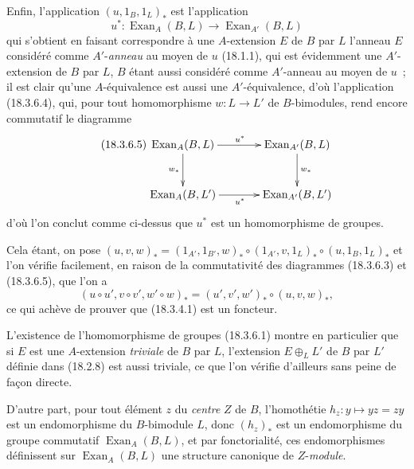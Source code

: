 \begin{env}[18.3.6.4]
\label{0.18.3.6.4-fr}
Enfin, l'application $(u,1_B,1_L)_*$ est l'application
\[
  u^*:\operatorname{Exan}_A(B,L)\longrightarrow
  \operatorname{Exan}_{A'}(B,L)
\]
qui s'obtient en faisant correspondre à une $A$-extension $E$ de $B$ par $L$
l'anneau $E$ considéré comme $A'$-\emph{anneau} au moyen de $u$ (18.1.1), qui
est évidemment une $A'$-extension de $B$ par $L$, $B$ étant aussi considéré
comme $A'$-anneau au moyen de $u$~; il est clair qu'une $A$-équivalence est
aussi une $A'$-équivalence, d'où l'application (18.3.6.4), qui, pour tout
homomorphisme $w:L\to L'$ de $B$-bimodules, rend encore commutatif le diagramme
\begin{equation}
\label{0.18.3.6.5-fr}
\tag{18.3.6.5}
  \xymatrix@C=3pc@R=2.4pc{
    \operatorname{Exan}_A(B,L)\ar[r]^{u^*}\ar[d]_{w_*}
      & \operatorname{Exan}_{A'}(B,L)\ar[d]^{w_*}\\
    \operatorname{Exan}_A(B,L')\ar[r]_{u^*}
      & \operatorname{Exan}_{A'}(B,L')
  }
\end{equation}
d'où l'on conclut comme ci-dessus que $u^*$ est un homomorphisme de groupes.

Cela étant, on pose
$(u,v,w)_*=(1_{A'},1_{B'},w)_*\circ(1_{A'},v,1_L)_*
\circ(u,1_B,1_L)_*$ et l'on vérifie facilement, en raison de la commutativité
des diagrammes (18.3.6.3) et (18.3.6.5), que l'on a
\[
  (u\circ u',v\circ v',w'\circ w)_*
  =(u',v',w')_*\circ(u,v,w)_*,
\]
ce qui achève de prouver que (18.3.4.1) est un foncteur.

L'existence de l'homomorphisme de groupes (18.3.6.1) montre en particulier
que si $E$ est une $A$-extension \emph{triviale} de $B$ par $L$, l'extension
$E\oplus_LL'$ de $B$ par $L'$ définie dans (18.2.8) est aussi triviale, ce que
l'on vérifie d'ailleurs sans peine de façon directe.

D'autre part, pour tout élément $z$ du \emph{centre} $Z$ de $B$, l'homothétie
$h_z:y\mapsto yz=zy$ est un endomorphisme du $B$-bimodule $L$, donc $(h_z)_*$
est un endomorphisme du groupe commutatif $\operatorname{Exan}_A(B,L)$, et par
fonctorialité, ces endomorphismes définissent sur
$\operatorname{Exan}_A(B,L)$ une structure canonique de $Z$-\emph{module}.
\end{env}

